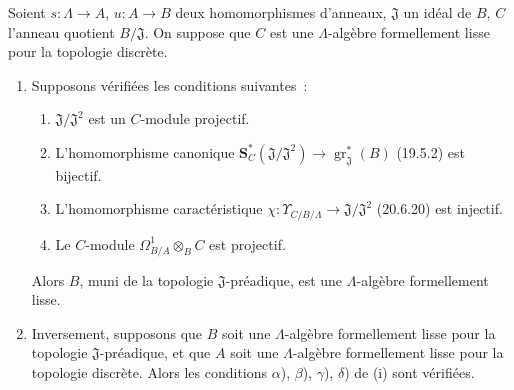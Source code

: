 \begin{theorem}[22.1.1]
\label{0.22.1.1-fr}
Soient $s:\Lambda\to A$, $u:A\to B$ deux homomorphismes d'anneaux,
$\mathfrak J$ un idéal de $B$, $C$ l'anneau quotient $B/\mathfrak J$. On
suppose que $C$ est une $\Lambda$-algèbre formellement lisse pour la topologie
discrète.
\begin{enumerate}
  \item[(i)] Supposons vérifiées les conditions suivantes~:
  \begin{enumerate}
    \item[$\alpha$)] $\mathfrak J/\mathfrak J^2$ est un $C$-module projectif.
    \item[$\beta$)] L'homomorphisme canonique
    $\mathbf S_C^*(\mathfrak J/\mathfrak J^2)\to
    \operatorname{gr}_{\mathfrak J}^*(B)$ (19.5.2) est bijectif.
    \item[$\gamma$)] L'homomorphisme caractéristique
    $\chi:\Upsilon_{C/B/\Lambda}\to\mathfrak J/\mathfrak J^2$ (20.6.20)
    est injectif.
    \item[$\delta$)] Le $C$-module
    $\Omega^1_{B/A}\otimes_BC$ est projectif.
  \end{enumerate}
  Alors $B$, muni de la topologie $\mathfrak J$-préadique, est une
  $\Lambda$-algèbre formellement lisse.

  \item[(ii)] Inversement, supposons que $B$ soit une $\Lambda$-algèbre
  formellement lisse pour la topologie $\mathfrak J$-préadique, et que $A$
  soit une $\Lambda$-algèbre formellement lisse pour la topologie discrète.
  Alors les conditions $\alpha$), $\beta$), $\gamma$), $\delta$) de (i) sont
  vérifiées.
\end{enumerate}
\end{theorem}

